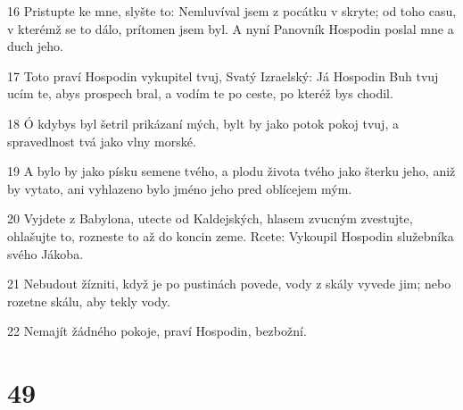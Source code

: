 \par 16 Pristupte ke mne, slyšte to: Nemluvíval jsem z pocátku v skryte; od toho casu, v kterémž se to dálo, prítomen jsem byl. A nyní Panovník Hospodin poslal mne a duch jeho.
\par 17 Toto praví Hospodin vykupitel tvuj, Svatý Izraelský: Já Hospodin Buh tvuj ucím te, abys prospech bral, a vodím te po ceste, po kteréž bys chodil.
\par 18 Ó kdybys byl šetril prikázaní mých, bylt by jako potok pokoj tvuj, a spravedlnost tvá jako vlny morské.
\par 19 A bylo by jako písku semene tvého, a plodu života tvého jako šterku jeho, aniž by vytato, ani vyhlazeno bylo jméno jeho pred oblícejem mým.
\par 20 Vyjdete z Babylona, utecte od Kaldejských, hlasem zvucným zvestujte, ohlašujte to, rozneste to až do koncin zeme. Rcete: Vykoupil Hospodin služebníka svého Jákoba.
\par 21 Nebudout žízniti, když je po pustinách povede, vody z skály vyvede jim; nebo rozetne skálu, aby tekly vody.
\par 22 Nemajít žádného pokoje, praví Hospodin, bezbožní.

\chapter{49}

